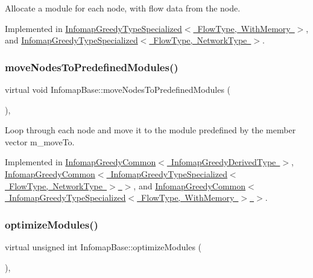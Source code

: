 Allocate a module for each node, with flow data from the node. 

Implemented in \mbox{\hyperlink{classInfomapGreedyTypeSpecialized_3_01FlowType_00_01WithMemory_01_4_a3b8cb78e45b8879069d662c3791a702e}{Infomap\+Greedy\+Type\+Specialized$<$ Flow\+Type, With\+Memory $>$}}, and \mbox{\hyperlink{classInfomapGreedyTypeSpecialized_a2f5fa9b865bcded24d7875f56d28d4c5}{Infomap\+Greedy\+Type\+Specialized$<$ Flow\+Type, Network\+Type $>$}}.

\mbox{\label{classInfomapBase_ab085f56e93df121d113b5869a51824c9}} 
\subsubsection{\texorpdfstring{move\+Nodes\+To\+Predefined\+Modules()}{moveNodesToPredefinedModules()}}
{\footnotesize\ttfamily virtual void Infomap\+Base\+::move\+Nodes\+To\+Predefined\+Modules (\begin{DoxyParamCaption}{ }\end{DoxyParamCaption})\hspace{0.3cm}{\ttfamily [protected]}, {}}

Loop through each node and move it to the module predefined by the member vector m\+\_\+move\+To. 

Implemented in \mbox{\hyperlink{classInfomapGreedyCommon_affbdd4750e010adba7f1cd15a295303e}{Infomap\+Greedy\+Common$<$ Infomap\+Greedy\+Derived\+Type $>$}}, \mbox{\hyperlink{classInfomapGreedyCommon_affbdd4750e010adba7f1cd15a295303e}{Infomap\+Greedy\+Common$<$ Infomap\+Greedy\+Type\+Specialized$<$ Flow\+Type, Network\+Type $>$ $>$}}, and \mbox{\hyperlink{classInfomapGreedyCommon_affbdd4750e010adba7f1cd15a295303e}{Infomap\+Greedy\+Common$<$ Infomap\+Greedy\+Type\+Specialized$<$ Flow\+Type, With\+Memory $>$ $>$}}.

\mbox{\label{classInfomapBase_a443a496b76cc78286cce345e018c4fd8}} 
\subsubsection{\texorpdfstring{optimize\+Modules()}{optimizeModules()}}
{\footnotesize\ttfamily virtual unsigned int Infomap\+Base\+::optimize\+Modules (\begin{DoxyParamCaption}{ }\end{DoxyParamCaption})\hspace{0.3cm}{\ttfamily [protected]}, {}}


